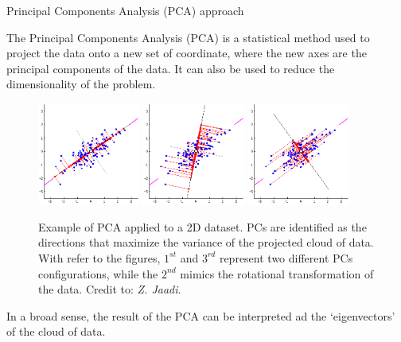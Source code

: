 \begin{frame}{Principal Components Analysis (PCA) approach}

    The Principal Components Analysis (PCA) is a statistical method used to project the data onto a new set of coordinate, where the new axes are the principal components of the data. It can also be used to reduce the dimensionality of the problem.

    \begin{figure}[H]
        \centering
        \includegraphics[width=0.3\textwidth]{img/principal-components-01.png}
        \hfill
        \includegraphics[width=0.3\textwidth]{img/principal-components-02.png}
        \hfill
        \includegraphics[width=0.3\textwidth]{img/principal-components-03.png}
        \caption{Example of PCA applied to a 2D dataset. PCs are identified as the directions that maximize the variance of the projected cloud of data. With refer to the figures, $1^{st}$ and $3^{rd}$ represent two different PCs configurations, while the $2^{nd}$ mimics the rotational transformation of the data. Credit to: \textit{Z. Jaadi}.}
    \end{figure}

    In a broad sense, the result of the PCA can be interpreted ad the `eigenvectors' of the cloud of data.

\end{frame}



